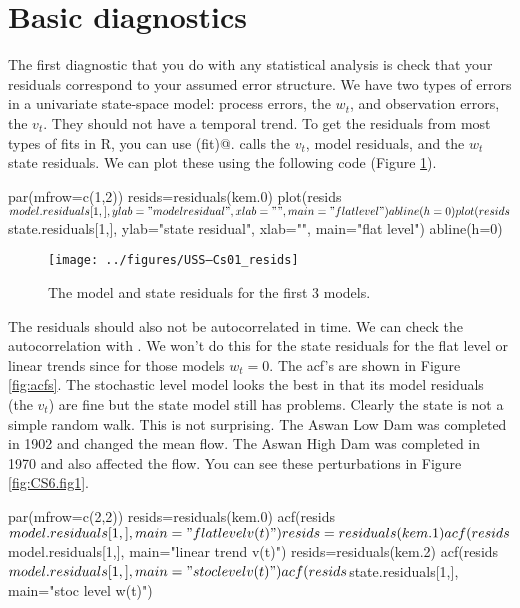 \section{Basic diagnostics}

The first diagnostic that you do with any statistical analysis is check that your residuals correspond to your assumed error structure.  We have two types of errors in a univariate state-space model: process errors, the $w_t$, and observation errors, the $v_t$.  
They should not have a temporal trend.  To get the residuals from most types of fits in R, you can use \verb@residuals(fit)@.  \verb@MARSS@ calls the $v_t$, model residuals, and the $w_t$ state residuals.  We can plot these using the following code (Figure \ref{fig:resids}).
\begin{Schunk}
\begin{Sinput}
 par(mfrow=c(1,2))
 resids=residuals(kem.0)
 plot(resids$model.residuals[1,], 
    ylab="model residual", xlab="", main="flat level")
 abline(h=0)
 plot(resids$state.residuals[1,], 
    ylab="state residual", xlab="", main="flat level")
 abline(h=0)
\end{Sinput}
\end{Schunk}

\begin{figure}[htp]
\begin{center}
\texttt{[image: ../figures/USS--Cs01\_resids]}
\end{center}
\caption{The model and state residuals for the first 3 models.}
\label{fig:resids}
\end{figure}

The residuals should also not be autocorrelated in time.  We can check the autocorrelation with \verb@acf@.  We won't do this for the state residuals for the flat level or linear trends since for those models $w_t=0$.  The acf's are shown in Figure \ref{fig:acfs}.  The stochastic level model looks the best in that its model residuals (the $v_t$) are fine but the state model still has problems.  Clearly the state is not a simple random walk.  This is not surprising.  The Aswan Low Dam was completed in 1902 and changed the mean flow.  The Aswan High Dam was completed in 1970 and also affected the flow.  You can see these perturbations in Figure \ref{fig:CS6.fig1}.

\begin{Schunk}
\begin{Sinput}
 par(mfrow=c(2,2))
 resids=residuals(kem.0)
 acf(resids$model.residuals[1,], main="flat level v(t)")
 resids=residuals(kem.1)
 acf(resids$model.residuals[1,], main="linear trend v(t)")
 resids=residuals(kem.2)
 acf(resids$model.residuals[1,], main="stoc level v(t)")
 acf(resids$state.residuals[1,], main="stoc level w(t)")
\end{Sinput}
\end{Schunk}

